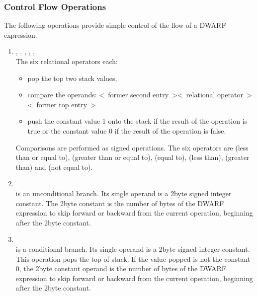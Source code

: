 \subsubsection{Control Flow Operations}
\label{chap:controlflowoperations}
The following operations provide simple control of the flow of a DWARF expression.
\begin{enumerate}[1]
\item  {}, , , , ,  \\
The six relational operators each:
\begin{itemize}
\item pop the top two stack values,

\item compare the operands:
\textless~former second entry~\textgreater  \textless~relational operator~\textgreater \textless~former top entry~\textgreater

\item push the constant value 1 onto the stack 
if the result of the operation is true or the
constant value 0 if the result of the operation is false.
\end{itemize}

Comparisons are performed as signed operations. The six
operators are  (less than or equal to), 
(greater than or equal to),  (equal to),  (less
than),  (greater than) and  (not equal to).

\item {} \\
 is an unconditional branch. Its single operand
is a 2\dash byte signed integer constant. The 2\dash byte constant is
the number of bytes of the DWARF expression to skip forward
or backward from the current operation, beginning after the
2\dash byte constant.

\item {} \\
 is a conditional branch. Its single operand is a
2\dash byte signed integer constant.  This operation pops the
top of stack. If the value popped is not the constant 0,
the 2\dash byte constant operand is the number of bytes of the
DWARF expression to skip forward or backward from the current
operation, beginning after the 2\dash byte constant.


\end{enumerate}
